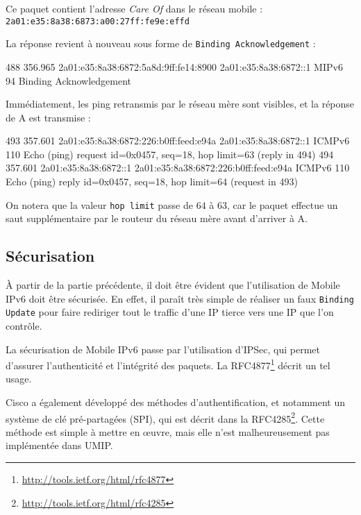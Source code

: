 Ce paquet contient l'adresse \emph{Care Of} dans le réseau mobile : \texttt{2a01:e35:8a38:6873:a00:27ff:fe9e:effd}

La réponse revient à nouveau sous forme de \texttt{Binding Acknowledgement} :

\begin{paquet}
488	356.965	2a01:e35:8a38:6872:5a8d:9ff:fe14:8900	2a01:e35:8a38:6872::1	MIPv6	94	Binding Acknowledgement
\end{paquet}

Immédiatement, les ping retransmis par le réseau mère sont visibles, et la réponse de A est transmise :

\begin{paquet}
493	357.601	2a01:e35:8a38:6872:226:b0ff:feed:e94a	2a01:e35:8a38:6872::1	ICMPv6	110	Echo (ping) request id=0x0457, seq=18, hop limit=63 (reply in 494)
494	357.601	2a01:e35:8a38:6872::1	2a01:e35:8a38:6872:226:b0ff:feed:e94a	ICMPv6	110	Echo (ping) reply id=0x0457, seq=18, hop limit=64 (request in 493)
\end{paquet}

On notera que la valeur \texttt{hop limit} passe de $64$ à $63$, car le paquet effectue un saut supplémentaire par le routeur du réseau mère avant d'arriver à A.

\subsection{Sécurisation}

À partir de la partie précédente, il doit être évident que l'utilisation de Mobile IPv6 doit être sécurisée.
En effet, il paraît très simple de réaliser un faux \texttt{Binding Update} pour faire rediriger tout le traffic d'une IP tierce vers une IP que l'on contrôle.

La sécurisation de Mobile IPv6 passe par l'utilisation d'IPSec, qui permet d'assurer l'authenticité et l'intégrité des paquets.
La RFC4877\footnote{\url{http://tools.ietf.org/html/rfc4877}} décrit un tel usage.

Cisco a également développé des méthodes d'authentification, et notamment un système de clé pré-partagées (SPI), qui est décrit dans la RFC4285\footnote{\url{http://tools.ietf.org/html/rfc4285}}.
Cette méthode est simple à mettre en œuvre, mais elle n'est malheureusement pas implémentée dans UMIP.

